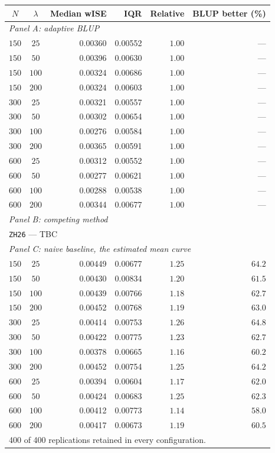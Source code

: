 \begin{tabular}{ccrrrr}
\hline
$N$ & $\lambda$ & Median wISE & IQR & Relative & BLUP better (\%) \\
\hline
\multicolumn{6}{l}{\textit{Panel A: adaptive BLUP}} \\
$150$ & $25$ & 0.00360 & 0.00552 & $1.00$ & --- \\
$150$ & $50$ & 0.00396 & 0.00630 & $1.00$ & --- \\
$150$ & $100$ & 0.00324 & 0.00686 & $1.00$ & --- \\
$150$ & $200$ & 0.00324 & 0.00603 & $1.00$ & --- \\
$300$ & $25$ & 0.00321 & 0.00557 & $1.00$ & --- \\
$300$ & $50$ & 0.00302 & 0.00654 & $1.00$ & --- \\
$300$ & $100$ & 0.00276 & 0.00584 & $1.00$ & --- \\
$300$ & $200$ & 0.00365 & 0.00591 & $1.00$ & --- \\
$600$ & $25$ & 0.00312 & 0.00552 & $1.00$ & --- \\
$600$ & $50$ & 0.00277 & 0.00621 & $1.00$ & --- \\
$600$ & $100$ & 0.00288 & 0.00538 & $1.00$ & --- \\
$600$ & $200$ & 0.00344 & 0.00677 & $1.00$ & --- \\
\hline
\multicolumn{6}{l}{\textit{Panel B: competing method}} \\
\multicolumn{6}{l}{\texttt{ZH26} --- TBC} \\
\hline
\multicolumn{6}{l}{\textit{Panel C: naive baseline, the estimated mean curve}} \\
$150$ & $25$ & 0.00449 & 0.00677 & $1.25$ & $64.2$ \\
$150$ & $50$ & 0.00430 & 0.00834 & $1.20$ & $61.5$ \\
$150$ & $100$ & 0.00439 & 0.00766 & $1.18$ & $62.7$ \\
$150$ & $200$ & 0.00452 & 0.00768 & $1.19$ & $63.0$ \\
$300$ & $25$ & 0.00414 & 0.00753 & $1.26$ & $64.8$ \\
$300$ & $50$ & 0.00422 & 0.00775 & $1.23$ & $62.7$ \\
$300$ & $100$ & 0.00378 & 0.00665 & $1.16$ & $60.2$ \\
$300$ & $200$ & 0.00452 & 0.00754 & $1.25$ & $64.2$ \\
$600$ & $25$ & 0.00394 & 0.00604 & $1.17$ & $62.0$ \\
$600$ & $50$ & 0.00424 & 0.00683 & $1.25$ & $62.3$ \\
$600$ & $100$ & 0.00412 & 0.00773 & $1.14$ & $58.0$ \\
$600$ & $200$ & 0.00417 & 0.00673 & $1.19$ & $60.5$ \\
\hline
\multicolumn{6}{l}{\footnotesize 400 of 400 replications retained in every configuration.} \\
\end{tabular}
